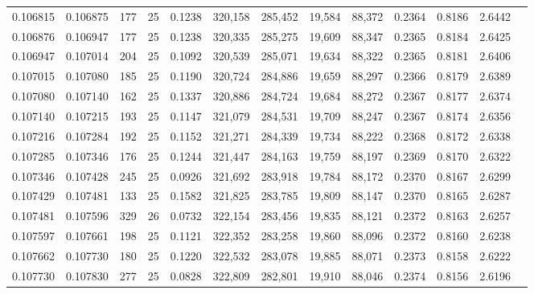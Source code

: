 \begin{tabular}{rrrrrrrrrrrrr}
0.106815 & 0.106875 &   177 &  25 &                                     0.1238 & 320,158 & 285,452 &  19,584 &  88,372 & 0.2364 & 0.8186 & 2.6442 \\
0.106876 & 0.106947 &   177 &  25 &                                     0.1238 & 320,335 & 285,275 &  19,609 &  88,347 & 0.2365 & 0.8184 & 2.6425 \\
0.106947 & 0.107014 &   204 &  25 &                                     0.1092 & 320,539 & 285,071 &  19,634 &  88,322 & 0.2365 & 0.8181 & 2.6406 \\
0.107015 & 0.107080 &   185 &  25 &                                     0.1190 & 320,724 & 284,886 &  19,659 &  88,297 & 0.2366 & 0.8179 & 2.6389 \\
0.107080 & 0.107140 &   162 &  25 &                                     0.1337 & 320,886 & 284,724 &  19,684 &  88,272 & 0.2367 & 0.8177 & 2.6374 \\
0.107140 & 0.107215 &   193 &  25 &                                     0.1147 & 321,079 & 284,531 &  19,709 &  88,247 & 0.2367 & 0.8174 & 2.6356 \\
0.107216 & 0.107284 &   192 &  25 &                                     0.1152 & 321,271 & 284,339 &  19,734 &  88,222 & 0.2368 & 0.8172 & 2.6338 \\
0.107285 & 0.107346 &   176 &  25 &                                     0.1244 & 321,447 & 284,163 &  19,759 &  88,197 & 0.2369 & 0.8170 & 2.6322 \\
0.107346 & 0.107428 &   245 &  25 &                                     0.0926 & 321,692 & 283,918 &  19,784 &  88,172 & 0.2370 & 0.8167 & 2.6299 \\
0.107429 & 0.107481 &   133 &  25 &                                     0.1582 & 321,825 & 283,785 &  19,809 &  88,147 & 0.2370 & 0.8165 & 2.6287 \\
0.107481 & 0.107596 &   329 &  26 &                                     0.0732 & 322,154 & 283,456 &  19,835 &  88,121 & 0.2372 & 0.8163 & 2.6257 \\
0.107597 & 0.107661 &   198 &  25 &                                     0.1121 & 322,352 & 283,258 &  19,860 &  88,096 & 0.2372 & 0.8160 & 2.6238 \\
0.107662 & 0.107730 &   180 &  25 &                                     0.1220 & 322,532 & 283,078 &  19,885 &  88,071 & 0.2373 & 0.8158 & 2.6222 \\
0.107730 & 0.107830 &   277 &  25 &                                     0.0828 & 322,809 & 282,801 &  19,910 &  88,046 & 0.2374 & 0.8156 & 2.6196 \\

\end{tabular}
